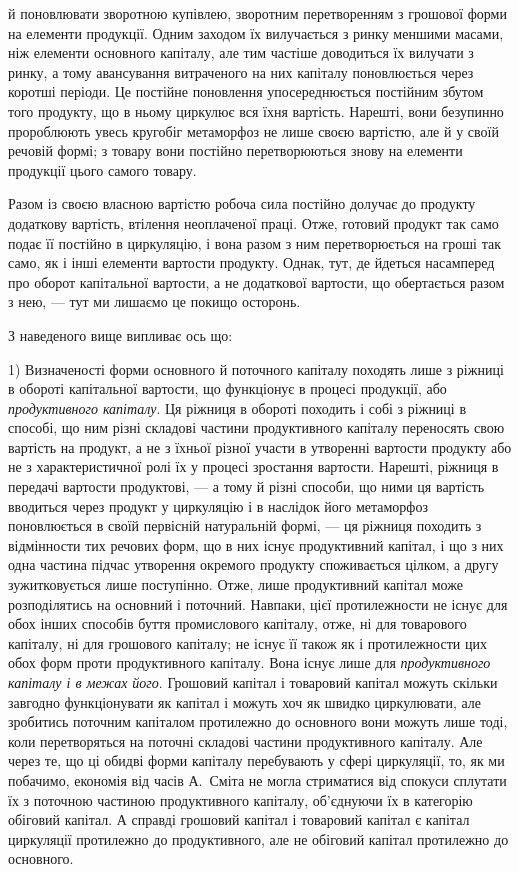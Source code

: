 \parcont{}  %
й поновлювати зворотною купівлею, зворотним перетворенням з грошової форми на елементи продукції.
Одним заходом їх вилучається з ринку меншими масами, ніж елементи основного капіталу, але тим
частіше доводиться їх вилучати з ринку, а тому авансування витраченого на них капіталу поновлюється
через коротші періоди. Це постійне поновлення упосереднюється постійним збутом того продукту, що в
ньому циркулює вся їхня вартість. Нарешті, вони безупинно пророблюють увесь кругобіг метаморфоз не
лише своєю вартістю, але й у своїй речовій формі; з товару вони постійно перетворюються знову на
елементи продукції цього самого товару.

Разом із своєю власною вартістю робоча сила постійно долучає до продукту додаткову вартість,
втілення неоплаченої праці. Отже, готовий продукт так само подає її постійно в циркуляцію, і вона
разом з ним перетворюється на гроші так само, як і інші елементи вартости продукту. Однак, тут, де
йдеться насамперед про оборот капітальної вартости, а не додаткової вартости, що обертається разом з
нею, — тут ми лишаємо це покищо осторонь.

З наведеного вище випливає ось що:

1) Визначеності форми основного й поточного капіталу походять лише з ріжниці в обороті капітальної
вартости, що функціонує в процесі продукції, або \emph{продуктивного капіталу}. Ця ріжниця в обороті
походить і собі з ріжниці в способі, що ним різні складові частини продуктивного капіталу переносять
свою вартість на продукт, а не з їхньої різної участи в утворенні вартости продукту або не з
характеристичної ролі їх у процесі зростання вартости. Нарешті, ріжниця в передачі вартости
продуктові, — а тому й різні способи, що ними ця вартість вводиться через продукт у циркуляцію і в
наслідок його метаморфоз поновлюється в своїй первісній натуральній формі, — ця ріжниця походить з
відмінности тих речових форм, що в них існує продуктивний капітал, і що з них одна частина підчас
утворення окремого продукту споживається цілком, а другу зужитковується лише поступінно. Отже, лише
продуктивний капітал може розподілятись на основний і поточний. Навпаки, цієї протилежности не існує
для обох інших способів буття промислового капіталу, отже, ні для товарового капіталу, ні для
грошового капіталу; не існує її також як і протилежности цих обох форм проти продуктивного капіталу.
Вона існує лише для \emph{продуктивного капіталу і в межах його}. Грошовий капітал і товаровий капітал
можуть скільки завгодно функціонувати як капітал і можуть хоч як швидко циркулювати, але зробитись
поточним капіталом протилежно до основного вони можуть лише тоді, коли перетворяться на поточні
складові частини продуктивного капіталу. Але через те, що ці обидві форми капіталу перебувають у
сфері циркуляції, то, як ми побачимо, економія від часів А.~Сміта не могла стриматися від спокуси
сплутати їх з поточною частиною продуктивного капіталу, об’єднуючи їх в категорію обіговий капітал.
А справді грошовий капітал і товаровий капітал є капітал циркуляції протилежно до продуктивного, але
не обіговий капітал протилежно до основного.

